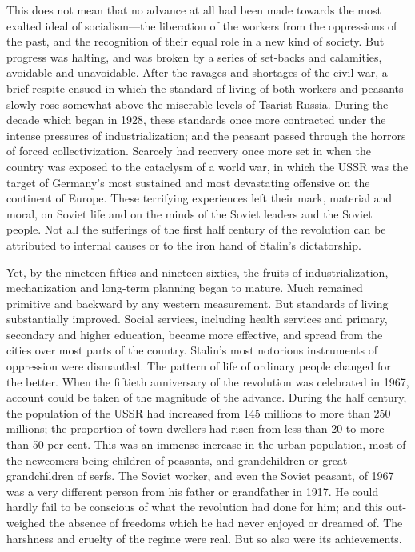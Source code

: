 This does not mean that no advance at all had been made towards the most exalted ideal of socialism---the liberation of the workers from the oppressions of the past, and the recognition of their equal role in a new kind of society. But progress was halting, and was broken by a series of set-backs and calamities, avoidable and unavoidable. After the ravages and shortages of the civil war, a brief respite ensued in which the standard of living of both workers and peasants slowly rose somewhat above the miserable levels of Tsarist Russia. During the decade which began in 1928, these standards once more contracted under the intense pressures of industrialization; and the peasant passed through the horrors of forced collectivization. Scarcely had recovery once more set in when the country was exposed to the cataclysm of a world war, in which the USSR was the target of Germany's most sustained and most devastating offensive on the continent of Europe. These terrifying experiences left their mark, material and moral, on Soviet life and on the minds of the Soviet leaders and the Soviet people. Not all the sufferings of the first half century of the revolution can be attributed to internal causes or to the iron hand of Stalin's dictatorship. 

Yet, by the nineteen-fifties and nineteen-sixties, the fruits of industrialization, mechanization and long-term planning began to mature. Much remained primitive and backward by any western measurement. But standards of living substantially improved. Social services, including health services and primary, secondary and higher education, became more effective, and spread from the cities over most parts of the country. Stalin's most notorious instruments of oppression were dismantled. The pattern of life of ordinary people changed for the better. When the fiftieth anniversary of the revolution was celebrated in 1967, account could be taken of the magnitude of the advance. During the half century, the population of the USSR had increased from 145 millions to more than 250 millions; the proportion of town-dwellers had risen from less than 20 to more than 50 per cent. This was an immense increase in the urban population, most of the newcomers being children of peasants, and grandchildren or great-grandchildren of serfs. The Soviet worker, and even the Soviet peasant, of 1967 was a very different person from his father or grandfather in 1917. He could hardly fail to be conscious of what the revolution had done for him; and this out-weighed the absence of freedoms which he had never enjoyed or dreamed of. The harshness and cruelty of the regime were real. But so also were its achievements. 

